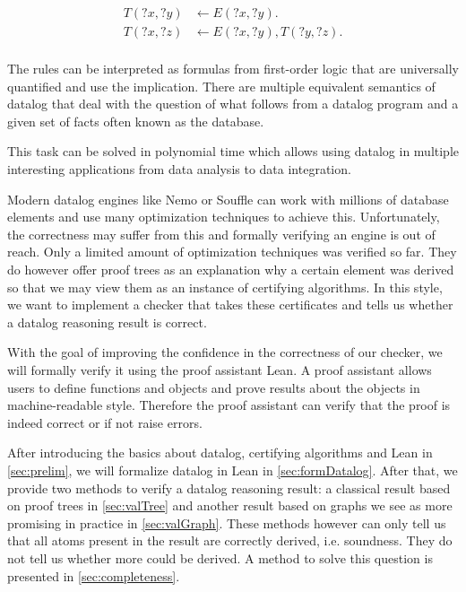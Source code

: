\begin{equation}
    \begin{split}
        T(?x, ?y) &\leftarrow E(?x, ?y). \\
        T(?x, ?z) &\leftarrow E(?x, ?y), T(?y, ?z). \\
    \end{split}
\end{equation}

The rules can be interpreted as formulas from first-order logic that are universally quantified and use the implication. There are multiple equivalent semantics of datalog that deal with the question of what follows from a datalog program and a given set of facts often known as the database.

This task can be solved in polynomial time which allows using datalog in multiple interesting applications from data analysis to data integration.

Modern datalog engines like Nemo\cite{Nemo} or Souffle\cite{Souffle} can work with millions of database elements and use many optimization techniques to achieve this. Unfortunately, the correctness may suffer from this and formally verifying an engine is out of reach. Only a limited amount of optimization techniques was verified so far\cite{datalogOptimizationsCoq}. They do however offer proof trees as an explanation why a certain element was derived so that we may view them as an instance of certifying algorithms. In this style, we want to implement a checker that takes these certificates and tells us whether a datalog reasoning result is correct.

With the goal of improving the confidence in the correctness of our checker, we will formally verify it using the proof assistant Lean\cite{Lean4}. A proof assistant allows users to define functions and objects and prove results about the objects in machine-readable style. Therefore the proof assistant can verify that the proof is indeed correct or if not raise errors.

After introducing the basics about datalog, certifying algorithms and Lean in \cref{sec:prelim}, we will formalize datalog in Lean in \cref{sec:formDatalog}. After that, we provide two methods to verify a datalog reasoning result: a classical result based on proof trees in \cref{sec:valTree} and another result based on graphs we see as more promising in practice in \cref{sec:valGraph}. 
These methods however can only tell us that all atoms present in the result are correctly derived, i.e. soundness. They do not tell us whether more could be derived. A method to solve this question is presented in \cref{sec:completeness}.

